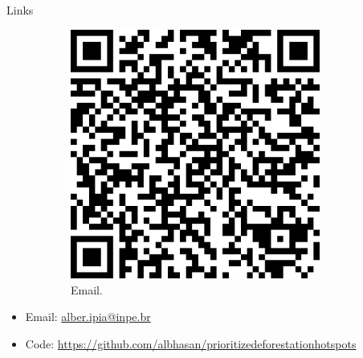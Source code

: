 \documentclass[20pt]{beamer}
\begin{document}
\begin{frame}[fragile,t]
\begin{columns}[t]
\begin{column}{0.33\linewidth}
\begin{block}{Links}
\vspace{0.5cm}
\begin{figure}
    \begin{subfigure}[b]{0.2\textwidth}
\centering
\includegraphics[width=0.90\textwidth]{images/qrcode_email_alber_ipia_at_inpe.png}\\
{Email.}
    \end{subfigure}
\end{figure}
\vspace{0.4cm}

\begin{itemize}
\item Email: 
\href{mailto:alber.ipia@inpe.br}{alber.ipia@inpe.br} 
\item Code: {\scriptsize\url{https://github.com/albhasan/prioritizedeforestationhotspots}}
\end{itemize}

    \end{block}
\end{column}


\end{columns}
\end{frame}
\end{document}

